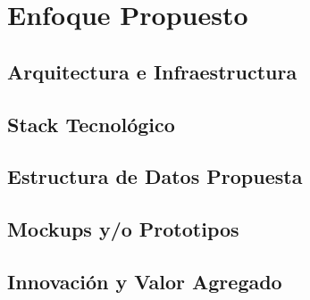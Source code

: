 \section{Enfoque Propuesto}

\subsection{Arquitectura e Infraestructura}

\subsection{Stack Tecnológico}

\subsection{Estructura de Datos Propuesta}

\subsection{Mockups y/o Prototipos}

\subsection{Innovación y Valor Agregado}